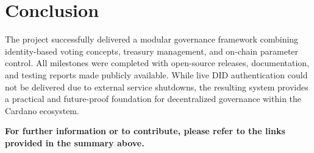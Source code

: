 \documentclass[11pt]{article}
\begin{document}
\section{Conclusion}
The project successfully delivered a modular governance framework combining identity-based voting concepts, treasury management, and on-chain parameter control.  
All milestones were completed with open-source releases, documentation, and testing reports made publicly available.  
While live DID authentication could not be delivered due to external service shutdowns, the resulting system provides a practical and future-proof foundation for decentralized governance within the Cardano ecosystem.

\bigskip

\noindent \textbf{For further information or to contribute, please refer to the links provided in the summary above.}
\end{document}
